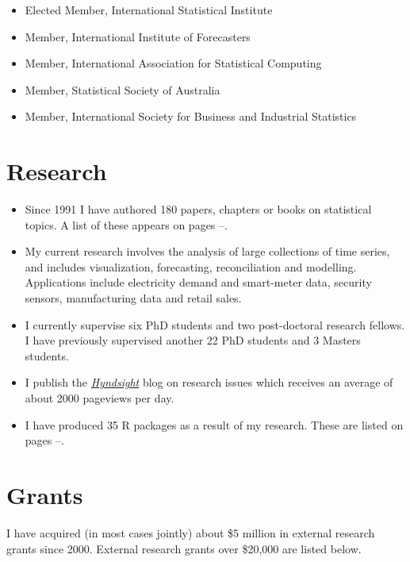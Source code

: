 \documentclass[10pt,a4paper,]{article}
\providecommand{\tightlist}{%
  \setlength{\itemsep}{0pt}\setlength{\parskip}{0pt}}
\newcounter{papers}
\begin{document}
\begin{itemize}
\tightlist
\item
  Elected Member, International Statistical Institute
\item
  Member, International Institute of Forecasters
\item
  Member, International Association for Statistical Computing
\item
  Member, Statistical Society of Australia
\item
  Member, International Society for Business and Industrial Statistics
\end{itemize}

\hypertarget{research}{%
\section{Research}\label{research}}

\begin{itemize}
\tightlist
\item
  Since 1991 I have authored 180 papers, chapters or books on
  statistical topics. A list of these appears on pages
  \pageref{papersstart}--\pageref{papersend}.
\item
  My current research involves the analysis of large collections of time
  series, and includes visualization, forecasting, reconciliation and
  modelling. Applications include electricity demand and smart-meter
  data, security sensors, manufacturing data and retail sales.
\item
  I currently supervise six PhD students and two post-doctoral research
  fellows. I have previously supervised another 22 PhD students and 3
  Masters students.
\item
  I publish the
  \href{https://robjhyndman.com/hyndsight}{\emph{Hyndsight}} blog on
  research issues which receives an average of about 2000 pageviews per
  day.
\item
  I have produced 35 R packages as a result of my research. These are
  listed on pages \pageref{packagestart}--\pageref{packageend}.
\end{itemize}

\newpage

\hypertarget{grants}{%
\section{Grants}\label{grants}}

I have acquired (in most cases jointly) about \$5 million in external
research grants since 2000. External research grants over \$20,000 are
listed below.
\end{document}

